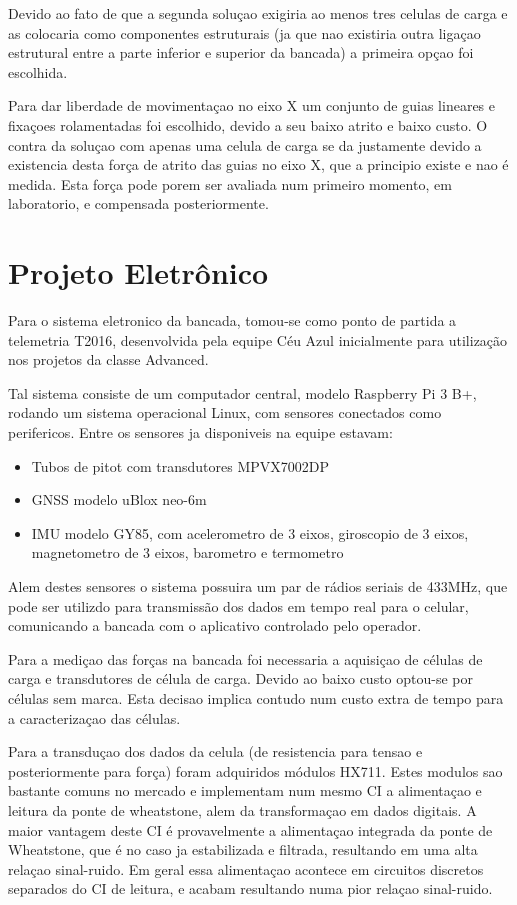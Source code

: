 Devido ao fato de que a segunda soluçao exigiria ao menos tres celulas de carga e as colocaria como componentes estruturais (ja que nao existiria outra ligaçao estrutural entre a parte inferior e superior da bancada) a primeira opçao foi escolhida.

Para dar liberdade de movimentaçao no eixo X um conjunto de guias lineares e fixaçoes rolamentadas foi escolhido, devido a seu baixo atrito e baixo custo. O contra da soluçao com apenas uma celula de carga se da justamente devido a existencia desta força de atrito das guias no eixo X, que a principio existe e nao é medida. Esta força pode porem ser avaliada num primeiro momento, em laboratorio, e compensada posteriormente.
    
\section{Projeto Eletrônico}

Para o sistema eletronico da bancada, tomou-se como ponto de partida a telemetria T2016, desenvolvida pela equipe Céu Azul inicialmente para utilização nos projetos da classe Advanced.

Tal sistema consiste de um computador central, modelo Raspberry Pi 3 B+, rodando um sistema operacional Linux, com sensores conectados como perifericos. Entre os sensores ja disponiveis na equipe estavam:

\begin{itemize}
    \item Tubos de pitot com transdutores MPVX7002DP
    \item GNSS modelo uBlox neo-6m
    \item IMU modelo GY85, com acelerometro de 3 eixos, giroscopio de 3 eixos, magnetometro de 3 eixos, barometro e termometro
\end{itemize}

Alem destes sensores o sistema possuira um par de rádios seriais de 433MHz, que pode ser utilizdo para transmissão dos dados em tempo real para o celular, comunicando a bancada com o aplicativo controlado pelo operador.

Para a mediçao das forças na bancada foi necessaria a aquisiçao de células de carga e transdutores de célula de carga. Devido ao baixo custo optou-se por células sem marca. Esta decisao implica contudo num custo extra de tempo para a caracterizaçao das células.

Para a transduçao dos dados da celula (de resistencia para tensao e posteriormente para força) foram adquiridos módulos HX711. Estes modulos sao bastante comuns no mercado e implementam num mesmo CI a alimentaçao e leitura da ponte de wheatstone, alem da transformaçao em dados digitais. A maior vantagem deste CI é provavelmente a alimentaçao integrada da ponte de Wheatstone, que é no caso ja estabilizada e filtrada, resultando em uma alta relaçao sinal-ruido. Em geral essa alimentaçao acontece em circuitos discretos separados do CI de leitura, e acabam resultando numa pior relaçao sinal-ruido.

